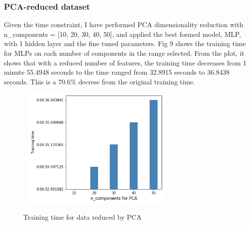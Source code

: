 \documentclass[letterpaper, 12 pt, conference]{ieeeconf}  %
\begin{document}
\subsubsection{PCA-reduced dataset}
Given the time constraint, I have performed PCA dimensionality reduction with n\_components = [10, 20, 30, 40, 50], and applied the best formed model, MLP, with 1 hidden layer and the fine tuned parameters. Fig 9 shows the training time for MLPs on each number of components in the range selected. From the plot, it shows that with a reduced number of features, the training time decreases from 1 minute 55.4948 seconds to the time ranged from 32.8915 seconds to 36.8438 seconds. This is a 70.6\% decrese from the original training time.\\
\begin{figure}[h]
	\includegraphics[width=8cm, height=6cm]{./figs/pca_t.png}\\
	\caption{Training time for data reduced by PCA}
	\label{fig:boat1}
\end{figure}\\
\end{document}
